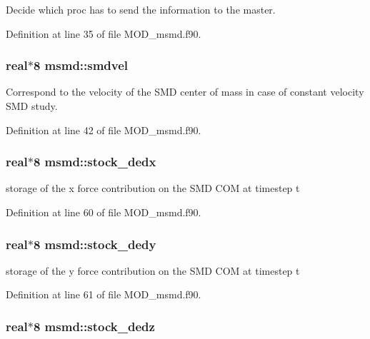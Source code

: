 Decide which proc has to send the information to the master. 



Definition at line 35 of file M\-O\-D\-\_\-msmd.\-f90.

\hypertarget{classmsmd_a1c3a1848e4d98289076e603fab46105a}{
\subsubsection[{smdvel}]{\setlength{\rightskip}{0pt plus 5cm}real$\ast$8 msmd\-::smdvel}}\label{classmsmd_a1c3a1848e4d98289076e603fab46105a}


Correspond to the velocity of the S\-M\-D center of mass in case of constant velocity S\-M\-D study. 



Definition at line 42 of file M\-O\-D\-\_\-msmd.\-f90.

\hypertarget{classmsmd_aff62c6bfe1f5b69ec9b8c2c4362c5dfa}{
\subsubsection[{stock\-\_\-dedx}]{\setlength{\rightskip}{0pt plus 5cm}real$\ast$8 msmd\-::stock\-\_\-dedx}}\label{classmsmd_aff62c6bfe1f5b69ec9b8c2c4362c5dfa}


storage of the x force contribution on the S\-M\-D C\-O\-M at timestep t 



Definition at line 60 of file M\-O\-D\-\_\-msmd.\-f90.

\hypertarget{classmsmd_a4b2d1c318a4e2326b9cccdba264cc363}{
\subsubsection[{stock\-\_\-dedy}]{\setlength{\rightskip}{0pt plus 5cm}real$\ast$8 msmd\-::stock\-\_\-dedy}}\label{classmsmd_a4b2d1c318a4e2326b9cccdba264cc363}


storage of the y force contribution on the S\-M\-D C\-O\-M at timestep t 



Definition at line 61 of file M\-O\-D\-\_\-msmd.\-f90.

\hypertarget{classmsmd_ab701a51c1aa7c929d6086f4d2550e55f}{
\subsubsection[{stock\-\_\-dedz}]{\setlength{\rightskip}{0pt plus 5cm}real$\ast$8 msmd\-::stock\-\_\-dedz}}\label{classmsmd_ab701a51c1aa7c929d6086f4d2550e55f}


